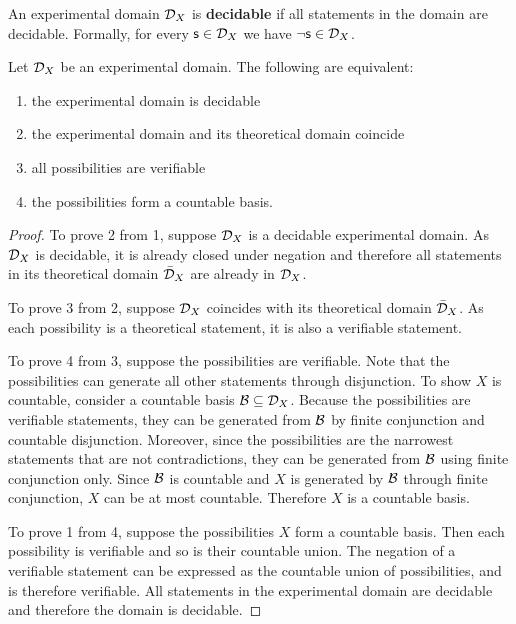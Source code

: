 \documentclass[11pt,letterpaper,fleqn]{memoir} %
\begin{document}
\begin{mathSection}
\begin{defn}
	An experimental domain $\mathcal{D}_X$ is \textbf{decidable} if all statements in the domain are decidable. Formally, for every $\mathsf{s} \in \mathcal{D}_X$ we have $\neg\mathsf{s} \in \mathcal{D}_X$.
\end{defn}

\begin{prop}
	Let $\mathcal{D}_X$ be an experimental domain. The following are equivalent:
	\begin{enumerate}
		\item the experimental domain is decidable
		\item the experimental domain and its theoretical domain coincide
		\item all possibilities are verifiable
		\item the possibilities form a countable basis.
	\end{enumerate}
\end{prop}

\begin{proof}
	To prove 2 from 1, suppose $\mathcal{D}_X$ is a decidable experimental domain. As $\mathcal{D}_X$ is decidable, it is already closed under negation and therefore all statements in its theoretical domain $\bar{\mathcal{D}}_X$ are already in $\mathcal{D}_X$.
	
	To prove 3 from 2, suppose $\mathcal{D}_X$ coincides with its theoretical domain $\bar{\mathcal{D}}_X$. As each possibility is a theoretical statement, it is also a verifiable statement.
	
	To prove 4 from 3, suppose the possibilities are verifiable. Note that the possibilities can generate all other statements through disjunction. To show $X$ is countable, consider a countable basis $\mathcal{B} \subseteq \mathcal{D}_X$. Because the possibilities are verifiable statements, they can be generated from $\mathcal{B}$ by finite conjunction and countable disjunction. Moreover, since the possibilities are the narrowest statements that are not contradictions, they can be generated from $\mathcal{B}$ using finite conjunction only. Since $\mathcal{B}$ is countable and $X$ is generated by $\mathcal{B}$ through finite conjunction, $X$ can be at most countable. Therefore $X$ is a countable basis.
	
	To prove 1 from 4, suppose the possibilities $X$ form a countable basis. Then each possibility is verifiable and so is their countable union. The negation of a verifiable statement can be expressed as the countable union of possibilities, and is therefore verifiable. All statements in the experimental domain are decidable and therefore the domain is decidable.
\end{proof}
\end{mathSection}
\end{document}
